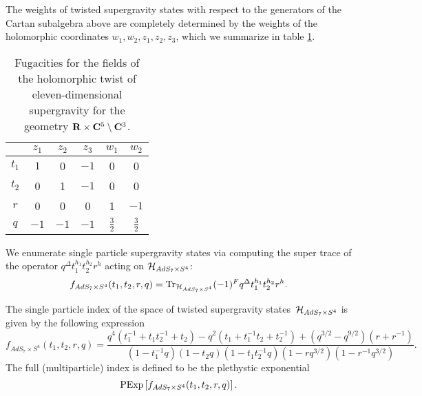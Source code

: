 \documentclass[../main.tex]{subfiles}
\begin{document}
The weights of twisted supergravity states with respect to the generators of the Cartan subalgebra above are completely determined by the weights of the holomorphic coordinates $w_1, w_2, z_1, z_2, z_3$, which we summarize in table \ref{tbl:sugraM5}.

\begin{table}
\begin{center}
\begin{tabular}{c c c c c c}
  & $z_{1}$ & $z_{2}$ & $z_{3}$ & $w_{1}$ & $w_{2}$ \\
  \hline
  $t_{1}$ & $1$ & 0 & $-1$ & 0 & 0 \\
  $t_{2}$ & 0 & 1 & $-1$ & 0 & 0 \\
  $r$ & 0 & 0 & 0 & 1 & $-1$ \\
  $q$ & $-1$ & $-1$ & $-1$ & $\frac{3}{2}$ & $\frac{3}{2}$
\end{tabular}
\caption{Fugacities for the fields of the holomorphic twist of eleven-dimensional supergravity for the geometry $\mathbf{R} \times \mathbf{C}^5 \setminus \mathbf{C}^3$.}
\label{tbl:sugraM5}
\end{center}
\end{table}

We enumerate single particle supergravity states via computing the super trace of the operator $q^\Delta t_1^{h_1} t_2^{h_2} r^h$ acting on $\mathcal{H}_{AdS_7\times S^4}$:
\begin{equation}
f_{AdS_7\times S^4}(t_1,t_2,r,q) = \text{Tr}_{\mathcal{H}_{AdS_7\times S^4}} (-1)^F q^\Delta t_1^{h_1} t_2^{h_2} r^h  .
\end{equation}

\begin{prop}
\label{prop:sugraindex1}
The single particle index of the space of twisted supergravity states~$\mathcal{H}_{AdS_7\times S^4}$ is given by the following expression
\begin{equation}
\label{eqn:sugra_index}
f_{AdS_7\times S^4} (t_1,t_2, r, q) = \frac{q^4(t_1^{-1}+t_1t_2^{-1}+t_2)-q^2(t_1+t_1^{-1}t_2+t_2^{-1})+(q^{3/2}-q^{9/2})(r+r^{-1})}{(1-t_{1}^{-1}q)(1-t_{2}q)(1-t_{1}t_{2}^{-1}q)(1-rq^{3/2})(1-r^{-1}q^{3/2})}.
\end{equation}
The full (multiparticle) index is defined to be the plethystic exponential 
\begin{equation}
{\rm PExp}\left[f_{AdS_7\times S^4}(t_1,t_2,r,q)\right] .
\end{equation}
\end{prop}
\end{document}
